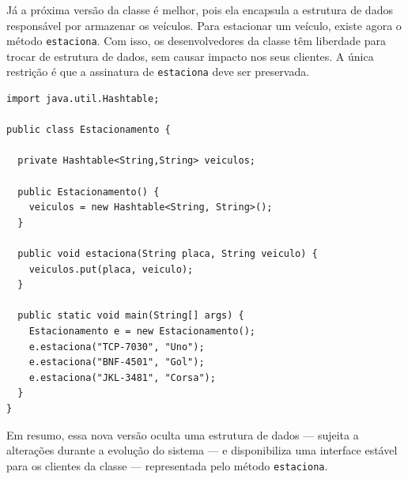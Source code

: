 \documentclass[
  11pt,
  twoside]{book}
\newcommand{\passthrough}[1]{#1}
\begin{document}
Já a próxima versão da classe é melhor, pois ela encapsula a estrutura
de dados responsável por armazenar os veículos. Para estacionar um
veículo, existe agora o método \passthrough{\lstinline!estaciona!}. Com
isso, os desenvolvedores da classe têm liberdade para trocar de
estrutura de dados, sem causar impacto nos seus clientes. A única
restrição é que a assinatura de \passthrough{\lstinline!estaciona!} deve
ser preservada.

\begin{lstlisting}
import java.util.Hashtable;

public class Estacionamento {

  private Hashtable<String,String> veiculos;

  public Estacionamento() {
    veiculos = new Hashtable<String, String>();
  }

  public void estaciona(String placa, String veiculo) {
    veiculos.put(placa, veiculo);
  }

  public static void main(String[] args) {
    Estacionamento e = new Estacionamento();
    e.estaciona("TCP-7030", "Uno");
    e.estaciona("BNF-4501", "Gol");
    e.estaciona("JKL-3481", "Corsa");
  }
}
\end{lstlisting}

Em resumo, essa nova versão oculta uma estrutura de dados --- sujeita a
alterações durante a evolução do sistema --- e disponibiliza uma
interface estável para os clientes da classe --- representada pelo
método \passthrough{\lstinline!estaciona!}.

 
\end{document}
